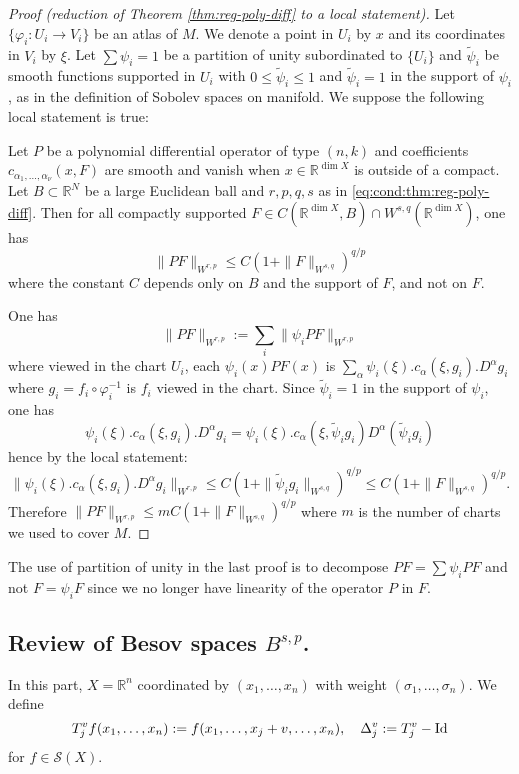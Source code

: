 \begin{proof}[Proof (reduction of Theorem \ref{thm:reg-poly-diff} to a local statement)]
Let \(\{ \varphi_i: U_i \longrightarrow V_i \}\) be an atlas of \(M\). We denote a point
in \(U_i\) by \(x\) and its coordinates in \(V_i\) by \(\xi\). Let \(\sum \psi_i
= 1\) be a partition of unity subordinated to \(\{U_i\}\) and \(\tilde \psi_i\)
be smooth functions supported in \(U_i\) with \(0\leq \tilde \psi_i \leq 1\) and \(\tilde \psi_i = 1\) in the support of
\(\psi_i\), as in the definition of Sobolev spaces on manifold. We suppose the following local statement is true:
\begin{lemma}
\label{lem:loc-reg-poly-diff}
Let \(P\) be a polynomial differential operator of type \((n,k)\) and coefficients \(c_{\alpha_1,\dots,\alpha_\nu}(x,F)\) are smooth and vanish when \(x\in \mathbb{R}^{\dim X}\) is
outside of a compact. Let \(B\subset \mathbb{R}^N\) be a large Euclidean ball and \(r,p,q,s\) as in \eqref{eq:cond:thm:reg-poly-diff}. Then for all compactly supported  \(F\in C (\mathbb{R}^{\dim X},B)
\cap W^{s,q}(\mathbb{R}^{\dim X})\), one has
\[
 \|P F \|_{W^{r,p}} \leq C\left(1 + \|F\|_{W^{s,q}}\right)^{q/p}
\]
where the constant \(C\) depends only on \(B\) and the support of \(F\), and not on \(F\).
\end{lemma}
One has
\[
\| PF \|_{W^{r,p}} := \sum_i \|\psi_i P F\|_{W^{r,p}}
\]
where viewed in the chart \(U_i\), each \(\psi_i(x) PF(x)\) is \(\sum_\alpha\psi_i(\xi). c_\alpha
(\xi,g_i). D^\alpha g_i\) where \(g_i = f_i\circ \varphi_i^{-1}\) is \(f_i\) viewed in
the chart. Since \(\tilde \psi_i = 1\) in the support of \(\psi_i\), one has
\[
 \psi_i(\xi). c_\alpha (\xi,g_i). D^\alpha g_i = \psi_i(\xi). c_\alpha(\xi,\tilde \psi_i g_i) D^\alpha
(\tilde\psi_i g_i)
\]
hence by the local statement:
\[
\| \psi_i(\xi). c_\alpha (\xi,g_i). D^\alpha g_i \|_{W^{r,p}} \leq C \left( 1 + 
\|\tilde \psi_i g_i\|_{W^{s,q}} \right)^{q/p} \leq C \left( 1 + \|F \|_{W^{s,q}}\right)^{q/p}.
\]
Therefore \(\|PF\|_{W^{r,p}} \leq m C \left( 1 + \|F \|_{W^{s,q}}\right)^{q/p}\) where
\(m\) is the number of charts we used to cover \(M\).
\end{proof}
\begin{remark}
The use of partition of unity in the last proof is to decompose \(PF = \sum \psi_i PF\)
and not \(F = \psi_i F\) since we no longer have linearity of the operator \(P\) in \(F\).
\end{remark}

\subsection{Review of Besov spaces \(B^{s,p}\).}
\label{sec:org44fac2b}
In this part, \(X = \mathbb{R}^n\) coordinated by \((x_1,\dots,x_n)\) with weight \((\sigma_1,\dots,\sigma_n)\). We define
\[
 T_j^v f(x_1,\dots,x_n) := f(x_1,\dots, x_j +v,\dots, x_n),\quad \Delta^v_j := T^v_j - {\rm Id}
\]
for \(f\in \mathcal{S}(X)\).

